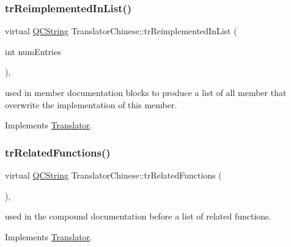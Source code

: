 \mbox{\label{class_translator_chinese_aeda3e83245e94e5d5001fb9bbb1fdf2f}} 
\subsubsection{\texorpdfstring{trReimplementedInList()}{trReimplementedInList()}}
{\footnotesize\ttfamily virtual \mbox{\hyperlink{class_q_c_string}{Q\+C\+String}} Translator\+Chinese\+::tr\+Reimplemented\+In\+List (\begin{DoxyParamCaption}\item[{int}]{num\+Entries }\end{DoxyParamCaption})\hspace{0.3cm}{\ttfamily [inline]}, {\ttfamily [virtual]}}

used in member documentation blocks to produce a list of all member that overwrite the implementation of this member. 

Implements \mbox{\hyperlink{class_translator}{Translator}}.

\mbox{\label{class_translator_chinese_a33d355b882bf23b7d745d21cc0465a60}} 
\subsubsection{\texorpdfstring{trRelatedFunctions()}{trRelatedFunctions()}}
{\footnotesize\ttfamily virtual \mbox{\hyperlink{class_q_c_string}{Q\+C\+String}} Translator\+Chinese\+::tr\+Related\+Functions (\begin{DoxyParamCaption}{ }\end{DoxyParamCaption})\hspace{0.3cm}{\ttfamily [inline]}, {\ttfamily [virtual]}}

used in the compound documentation before a list of related functions. 

Implements \mbox{\hyperlink{class_translator}{Translator}}.

\mbox{\label{class_translator_chinese_ac6885fb75068c0f8db3955f6f79a7179}} 
